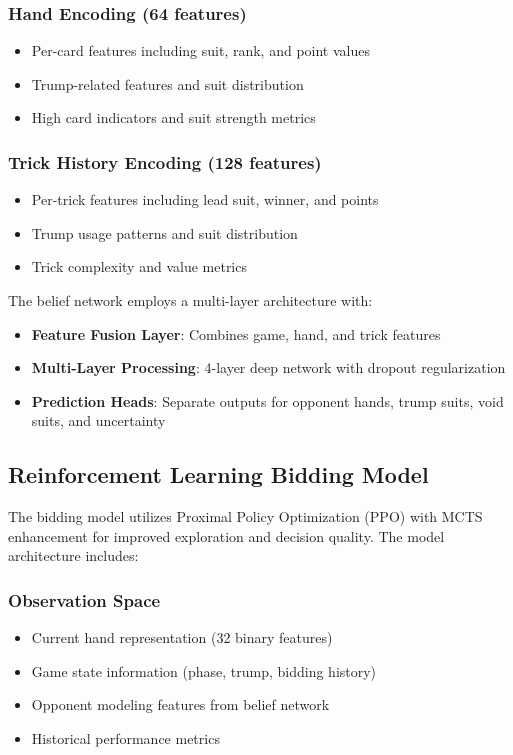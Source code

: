 \documentclass[conference]{IEEEtran}
\begin{document}
\subsubsection{Hand Encoding (64 features)}
\begin{itemize}
    \item Per-card features including suit, rank, and point values
    \item Trump-related features and suit distribution
    \item High card indicators and suit strength metrics
\end{itemize}

\subsubsection{Trick History Encoding (128 features)}
\begin{itemize}
    \item Per-trick features including lead suit, winner, and points
    \item Trump usage patterns and suit distribution
    \item Trick complexity and value metrics
\end{itemize}

The belief network employs a multi-layer architecture with:
\begin{itemize}
    \item \textbf{Feature Fusion Layer}: Combines game, hand, and trick features
    \item \textbf{Multi-Layer Processing}: 4-layer deep network with dropout regularization
    \item \textbf{Prediction Heads}: Separate outputs for opponent hands, trump suits, void suits, and uncertainty
\end{itemize}

\subsection{Reinforcement Learning Bidding Model}

The bidding model utilizes Proximal Policy Optimization (PPO) with MCTS enhancement for improved exploration and decision quality. The model architecture includes:

\subsubsection{Observation Space}
\begin{itemize}
    \item Current hand representation (32 binary features)
    \item Game state information (phase, trump, bidding history)
    \item Opponent modeling features from belief network
    \item Historical performance metrics
\end{itemize}
\end{document}

